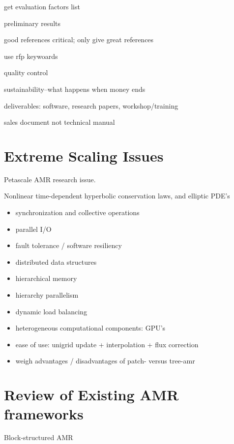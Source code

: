 \documentclass{article}
\begin{document}
get evaluation factors list

preliminary results

good references critical; only give great references

use rfp keywoards

quality control

sustainability--what happens when money ends

deliverables: software, research papers, workshop/training

sales document not technical manual


\section{Extreme Scaling Issues} \label{s:scaling}

Petascale AMR research issue.


Nonlinear time-dependent hyperbolic conservation laws, and elliptic PDE's

\begin{itemize}
\item synchronization and collective operations
\item parallel I/O
\item fault tolerance / software resiliency
\item distributed data structures
\item hierarchical memory
\item hierarchy parallelism
\item dynamic load balancing
\item heterogeneous computational components: GPU's
\item ease of use: unigrid update + interpolation + flux correction
\item weigh advantages / disadvantages of patch- versus tree-amr
\end{itemize}


\section{Review of Existing AMR frameworks}


  Block-structured AMR

\end{document}
